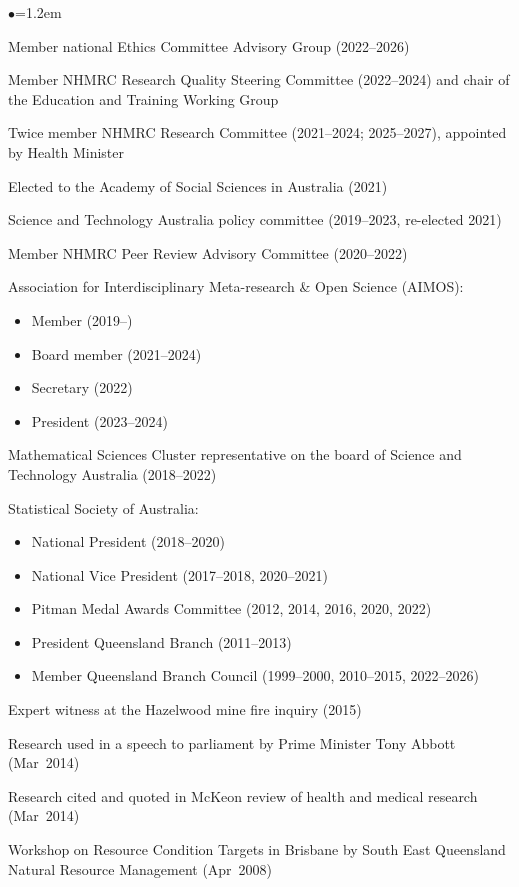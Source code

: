 \documentclass[a4paper,11pt]{article}
\renewcommand{\labelitemi}{$\bullet$}
\begin{document}
\begin{raggedright}
\begin{list}{\labelitemi}{\leftmargin=1.2em}\addtolength{\itemsep}{-0.4\baselineskip}
\item Member national Ethics Committee Advisory Group (2022--2026)
\item Member NHMRC Research Quality Steering Committee (2022--2024) and chair of the Education and Training Working Group 
\item Twice member NHMRC Research Committee (2021--2024; 2025--2027), appointed by Health Minister
\item Elected to the Academy of Social Sciences in Australia (2021)
\item Science and Technology Australia policy committee (2019--2023, re-elected 2021)
\item Member NHMRC Peer Review Advisory Committee (2020--2022)
\item Association for Interdisciplinary Meta-research \& Open Science (AIMOS):
\begin{itemize}
\item Member (2019--)
\item Board member (2021--2024)
\item Secretary (2022)
\item President (2023--2024)
\end{itemize}
\item Mathematical Sciences Cluster representative on the board of Science and Technology Australia (2018--2022)
\item Statistical Society of Australia:
\begin{itemize}
\item National President (2018--2020)
\item National Vice President (2017--2018, 2020--2021)
\item Pitman Medal Awards Committee (2012, 2014, 2016, 2020, 2022)
\item President Queensland Branch (2011--2013)
\item Member Queensland Branch Council (1999--2000, 2010--2015, 2022--2026)
\end{itemize}
\item Expert witness at the Hazelwood mine fire inquiry (2015)
\item Research used in a speech to parliament by Prime Minister Tony Abbott (Mar~2014)
\item Research cited and quoted in McKeon review of health and medical research (Mar~2014)
\item Workshop on Resource Condition Targets in Brisbane by South East Queensland Natural Resource Management (Apr~2008)

\end{list}
\end{raggedright}
\end{document}
